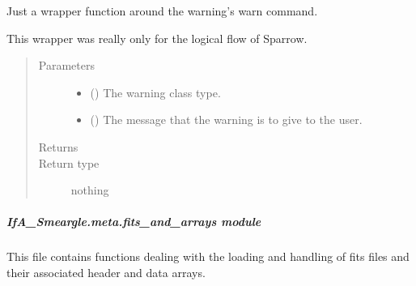 \documentclass[letterpaper,10pt,english]{sphinxmanual}
\begin{document}

\begin{fulllineitems}
\label{\detokenize{python_docstrings/IfA_Smeargle.meta.errors:IfA_Smeargle.meta.errors.smeargle_warning}}
Just a wrapper function around the warning’s warn command.

This wrapper was really only for the logical flow of Sparrow.
\begin{quote}\begin{description}
\item[{Parameters}] \leavevmode\begin{itemize}
\item {} 
 () \textendash{} The warning class type.

\item {} 
 () \textendash{} The message that the warning is to give to the user.

\end{itemize}

\item[{Returns}] \leavevmode


\item[{Return type}] \leavevmode
nothing

\end{description}\end{quote}

\end{fulllineitems}



\subparagraph{IfA\_Smeargle.meta.fits\_and\_arrays module}
\label{\detokenize{python_docstrings/IfA_Smeargle.meta.fits_and_arrays:module-IfA_Smeargle.meta.fits_and_arrays}}\label{\detokenize{python_docstrings/IfA_Smeargle.meta.fits_and_arrays:ifa-smeargle-meta-fits-and-arrays-module}}\label{\detokenize{python_docstrings/IfA_Smeargle.meta.fits_and_arrays::doc}}
This file contains functions dealing with the loading and handling of fits files and their
associated header and data arrays.
\end{document}
